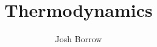 \documentclass[11pt]{report}
\begin{document}
\title{Thermodynamics}
\author{Josh Borrow}

\maketitle



\end{document}
